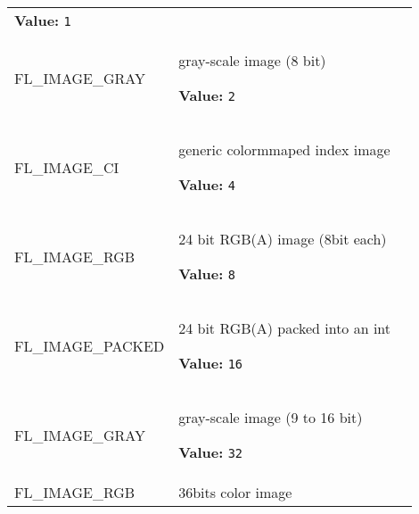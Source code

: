 \begin{longtable}{|p{\varnamewidth}|p{\vardescrwidth}|l}
\textbf{Value:} 
{\tt 1}&\\
\cline{1-2}
\raggedright F\-L\-\_\-I\-M\-A\-G\-E\-\_\-G\-R\-A\-Y\- & \raggedright gray-scale image (8 bit)

\textbf{Value:} 
{\tt 2}&\\
\cline{1-2}
\raggedright F\-L\-\_\-I\-M\-A\-G\-E\-\_\-C\-I\- & \raggedright generic colormmaped index image

\textbf{Value:} 
{\tt 4}&\\
\cline{1-2}
\raggedright F\-L\-\_\-I\-M\-A\-G\-E\-\_\-R\-G\-B\- & \raggedright 24 bit RGB(A) image (8bit each)

\textbf{Value:} 
{\tt 8}&\\
\cline{1-2}
\raggedright F\-L\-\_\-I\-M\-A\-G\-E\-\_\-P\-A\-C\-K\-E\-D\- & \raggedright 24 bit RGB(A) packed into an int

\textbf{Value:} 
{\tt 16}&\\
\cline{1-2}
\raggedright F\-L\-\_\-I\-M\-A\-G\-E\-\_\-G\-R\-A\-Y\-1\-6\- & \raggedright gray-scale image (9 to 16 bit)

\textbf{Value:} 
{\tt 32}&\\
\cline{1-2}
\raggedright F\-L\-\_\-I\-M\-A\-G\-E\-\_\-R\-G\-B\-1\-6\- & \raggedright 36bits color image


\end{longtable}
